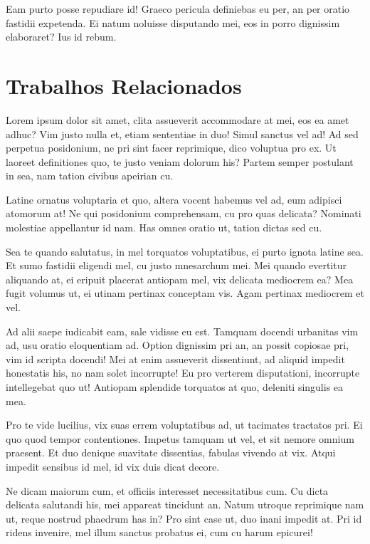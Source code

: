 \documentclass[
	12pt,				%
	openright,			%
	oneside,			%
	a4paper,			%
	english,			%
	french,				%
	spanish,			%
	brazil,				%
	]{abntex2}
\begin{document}
Eam purto posse repudiare id! Graeco pericula definiebas eu per, an per oratio fastidii expetenda. Ei natum noluisse disputando mei, eos in porro dignissim elaboraret? Ius id rebum.


\chapter{Trabalhos Relacionados}
\label{ch: trabalhos relacionados}

Lorem ipsum dolor sit amet, clita assueverit accommodare at mei, eos ea amet adhuc? Vim justo nulla et, etiam sententiae in duo! Simul sanctus vel ad! Ad sed perpetua posidonium, ne pri sint facer reprimique, dico voluptua pro ex. Ut laoreet definitiones quo, te justo veniam dolorum his? Partem semper postulant in sea, nam tation civibus apeirian cu.

Latine ornatus voluptaria et quo, altera vocent habemus vel ad, eum adipisci atomorum at! Ne qui posidonium comprehensam, cu pro quas delicata? Nominati molestiae appellantur id nam. Has omnes oratio ut, tation dictas sed cu.

Sea te quando salutatus, in mel torquatos voluptatibus, ei purto ignota latine sea. Et sumo fastidii eligendi mel, cu justo mnesarchum mei. Mei quando evertitur aliquando at, ei eripuit placerat antiopam mel, vix delicata mediocrem ea? Mea fugit volumus ut, ei utinam pertinax conceptam vis. Agam pertinax mediocrem et vel.

Ad alii saepe iudicabit eam, sale vidisse eu est. Tamquam docendi urbanitas vim ad, usu oratio eloquentiam ad. Option dignissim pri an, an possit copiosae pri, vim id scripta docendi! Mei at enim assueverit dissentiunt, ad aliquid impedit honestatis his, no nam solet incorrupte! Eu pro verterem disputationi, incorrupte intellegebat quo ut! Antiopam splendide torquatos at quo, deleniti singulis ea mea.

Pro te vide lucilius, vix suas errem voluptatibus ad, ut tacimates tractatos pri. Ei quo quod tempor contentiones. Impetus tamquam ut vel, et sit nemore omnium praesent. Et duo denique suavitate dissentias, fabulas vivendo at vix. Atqui impedit sensibus id mel, id vix duis dicat decore.

Ne dicam maiorum cum, et officiis interesset necessitatibus cum. Cu dicta delicata salutandi his, mei appareat tincidunt an. Natum utroque reprimique nam ut, reque nostrud phaedrum has in? Pro sint case ut, duo inani impedit at. Pri id ridens invenire, mel illum sanctus probatus ei, cum cu harum epicurei!
\end{document}
